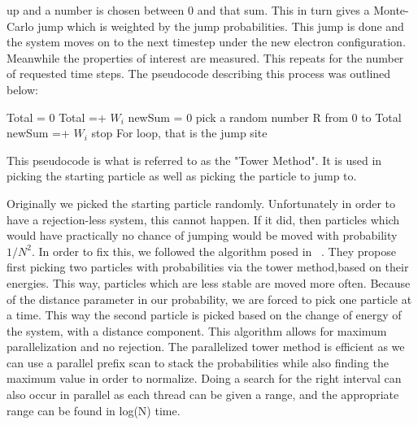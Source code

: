 up and a number is chosen between 0 and that sum. This in turn gives a Monte-Carlo jump which is weighted by the jump probabilities. This jump is done and the system moves on to the next timestep under the new electron configuration. Meanwhile the properties of interest are measured. This repeats for the number of requested time steps. The pseudocode describing this process was outlined below:


\begin{varwidth}{\dimexpr{}\fboxrule\relax}
\begin{algorithmic}[1]
\State Total = 0
\State Total =+ $W_i$
\EndFor
\State newSum = 0
\State pick a random number R from 0 to Total
\State newSum =+ $W_i$
\State stop For loop, that is the jump site
\EndIf
\EndFor

This pseudocode is what is referred to as the "Tower Method". It is used in picking the starting particle as well as picking the particle to jump to.
\end{algorithmic}
\end{varwidth}%

Originally we picked the starting particle randomly. Unfortunately in order to have a rejection-less system, this cannot happen. If it did, then particles which would have practically no chance of jumping would be moved with probability $ 1/N^2$. In order to fix this, we followed the algorithm posed in ~\cite{Newman99}. They propose first picking two particles with probabilities via the tower method,based on their energies. This way, particles which are less stable are moved more often. Because of the distance parameter in our probability, we are forced to pick one particle at a time. This way the second particle is picked based on the change of energy of the system, with a distance component. This algorithm allows for maximum parallelization and no rejection. The parallelized tower method is efficient as we can use a parallel prefix scan to stack the probabilities while also finding the maximum value in order to normalize. Doing a search for the right interval can also occur in parallel as each thread can be given a range, and the appropriate range can be found in log(N) time.

